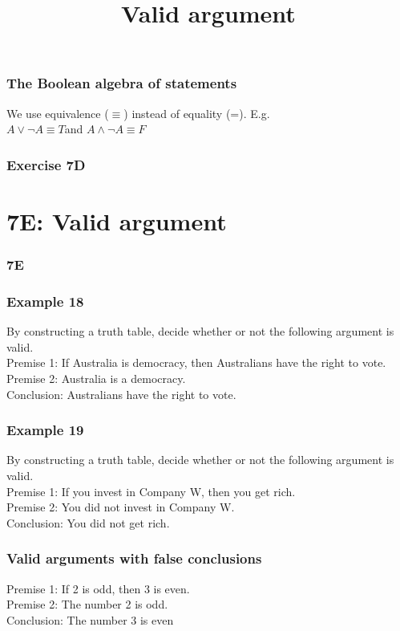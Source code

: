 \documentclass[
	11pt, %
]{beamer}
\begin{document}
\begin{frame}
    \frametitle{The Boolean algebra of statements}
    We use equivalence ($\equiv$) instead of equality (=). E.g.\\
    $A \lor \lnot A \equiv T$\quad and \quad $A \land \lnot A \equiv F$ 
\end{frame}

\begin{frame}
    \frametitle{Exercise 7D}
\end{frame}

\section{7E: Valid argument}
\begin{frame}
    \frametitle{7E}
    \begin{center}
        \title{Valid argument}
        \maketitle
    \end{center}
\end{frame}

\begin{frame}[t]
    \frametitle{Example 18}
    By constructing a truth table, decide whether or not the following argument is valid.\\
    Premise 1: If Australia is democracy, then Australians have the right to vote.\\
    Premise 2: Australia is a democracy.\\
    Conclusion: Australians have the right to vote.
\end{frame}

\begin{frame}[t]
    \frametitle{Example 19}
    By constructing a truth table, decide whether or not the following argument is valid.\\
    Premise 1: If you invest in Company W, then you get rich.\\
    Premise 2: You did not invest in Company W.\\
    Conclusion: You did not get rich.
\end{frame}

\begin{frame}
    \frametitle{Valid arguments with false conclusions}
    Premise 1: If 2 is odd, then 3 is even.\\
    Premise 2: The number 2 is odd.\\
    Conclusion: The number 3 is even
\end{frame}
\end{document}
